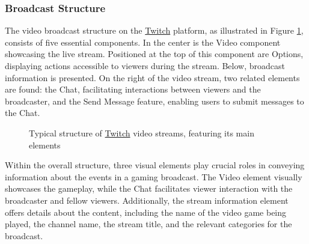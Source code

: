     \subsubsection*{Broadcast Structure}
    The video broadcast structure on the \href{https://www.twitch.tv/}{Twitch} platform, as illustrated in Figure \ref{fig:TwitchStreamStructure}, consists of five essential components. In the center is the Video component showcasing the live stream. Positioned at the top of this component are Options, displaying actions accessible to viewers during the stream. Below, broadcast information is presented. On the right of the video stream, two related elements are found: the Chat, facilitating interactions between viewers and the broadcaster, and the Send Message feature, enabling users to submit messages to the Chat.

    \begin{figure}[htbp]
        \centering
        \fboxsep=0pt\fboxrule=0.5pt
        \caption{Typical structure of \href{https://www.twitch.tv/}{Twitch} video streams, featuring its main elements}
        \label{fig:TwitchStreamStructure}
    \end{figure}

    Within the overall structure, three visual elements play crucial roles in conveying information about the events in a gaming broadcast. The Video element visually showcases the gameplay, while the Chat facilitates viewer interaction with the broadcaster and fellow viewers. Additionally, the stream information element offers details about the content, including the name of the video game being played, the channel name, the stream title, and the relevant categories for the broadcast.

